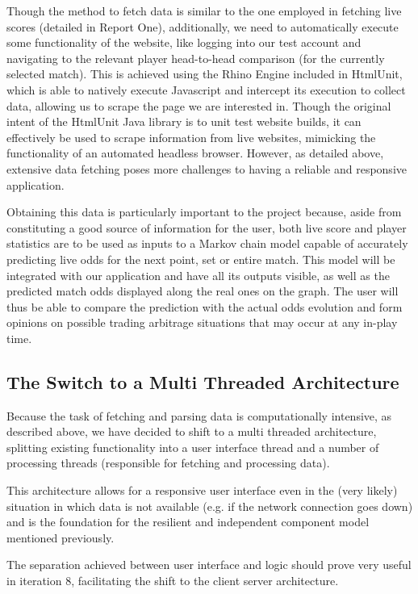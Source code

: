 \documentclass[10pt]{report}
\begin{document}
Though the method to fetch data is similar to the one employed in fetching live scores (detailed in Report One), additionally, we need to automatically execute some functionality of the website, like logging into our test account and navigating to the relevant player head-to-head comparison (for the currently selected match). This is achieved using the Rhino Engine included in HtmlUnit, which is able to natively execute Javascript and intercept its execution to collect data, allowing us to scrape the page we are interested in. Though the original intent of the HtmlUnit Java library is to unit test website builds, it can effectively be used to scrape information from live websites, mimicking the functionality of an automated headless browser. However, as detailed above, extensive data fetching poses more challenges to having a reliable and responsive application.

Obtaining this data is particularly important to the project because, aside from constituting a good source of information for the user, both live score and player statistics are to be used as inputs to a Markov chain model capable of accurately predicting live odds for the next point, set or entire match. This model will be integrated with our application and have all its outputs visible, as well as the predicted match odds displayed along the real ones on the graph. The user will thus be able to compare the prediction with the actual odds evolution and form opinions on possible trading arbitrage situations that may occur at any in-play time.

\subsection{The Switch to a Multi Threaded Architecture}
Because the task of fetching and parsing data is computationally intensive, as described above, we have decided to shift to a multi threaded architecture, splitting existing functionality into a user interface thread and a number of processing threads (responsible for fetching and processing data).

This architecture allows for a responsive user interface even in the (very likely) situation in which data is not available (e.g. if the network connection goes down) and is the foundation for the resilient and independent component model mentioned previously.

The separation achieved between user interface and logic should prove very  useful in iteration 8, facilitating the shift to the client server architecture.
\end{document}
